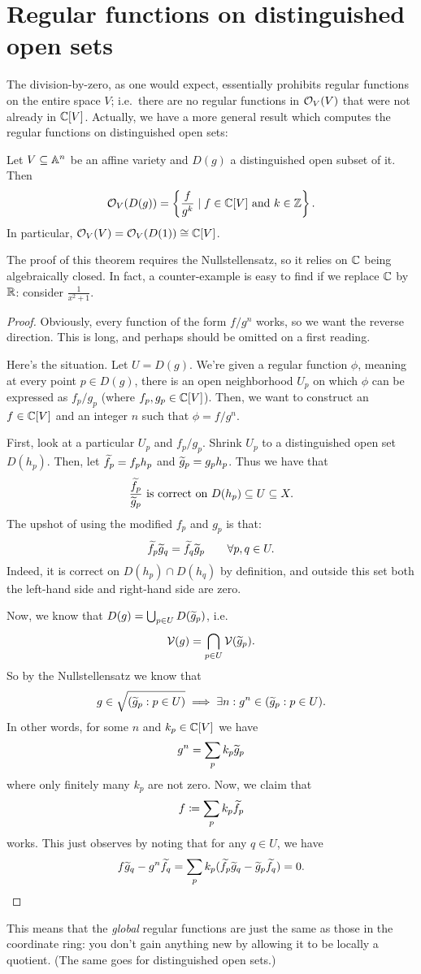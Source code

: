 \section{Regular functions on distinguished open sets}
The division-by-zero, as one would expect,
essentially prohibits regular functions on the entire space $V$;
i.e.\ there are no regular functions in $\mathcal O_V(V)$
that were not already in $\mathbb C[V]$.
Actually, we have a more general result which computes the
regular functions on distinguished open sets:
\begin{theorem}
	\label{thm:reg_func_distinguish_open}
	Let $V \subseteq \mathbb A^n$ be an affine variety
	and $D(g)$ a distinguished open subset of it.
	Then
	\[ \mathcal O_V( D(g) ) = \left\{ \frac{f}{g^k}
		\mid f \in \mathbb C[V] \text{ and } k \in \mathbb Z \right\}.  \]
	In particular, $\mathcal O_V(V) = \mathcal O_V(D(1)) \cong \mathbb C[V]$.
\end{theorem}
The proof of this theorem requires the Nullstellensatz,
so it relies on $\mathbb C$ being algebraically closed.
In fact, a counter-example is easy to find if we replace $\mathbb C$ by $\mathbb R$:
consider $\frac{1}{x^2+1}$.
\begin{proof}
	Obviously, every function of the form $f/g^n$ works,
	so we want the reverse direction.
	This is long, and perhaps should be omitted on a first reading.

	Here's the situation.
	Let $U = D(g)$.
	We're given a regular function $\phi$, meaning at every point $p \in D(g)$,
	there is an open neighborhood $U_p$ on which $\phi$ can be expressed
	as $f_p / g_p$ (where $f_p, g_p \in \mathbb C[V]$).
	Then, we want to construct an $f \in \mathbb C[V]$ and an integer $n$
	such that $\phi = f/g^n$.

	First, look at a particular $U_p$ and $f_p / g_p$.
	Shrink $U_p$ to a distinguished open set $D(h_p)$.
	Then, let $\widetilde f_p = f_p h_p$ and $\widetilde g_p = g_p h_p$.
	Thus we have that
	\[ \frac{\widetilde f_p}{\widetilde g_p} \text{ is correct on }
		D(h_p) \subseteq U \subseteq X. \]
	The upshot of using the modified $f_p$ and $g_p$ is that:
	\[ \widetilde f_p \widetilde g_q = \widetilde f_q \widetilde g_p \qquad \forall p,q \in U. \]
	Indeed, it is correct on $D(h_p) \cap D(h_q)$ by definition,
	and outside this set both the left-hand side and right-hand side are zero.

	Now, we know that $D(g) = \bigcup_{p \in U} D(\widetilde g_p)$, i.e.\
	\[ \mathcal V(g) = \bigcap_{p \in U} \mathcal V(\widetilde g_p). \]
	So by the Nullstellensatz we know that
	\[ g \in \sqrt{(\widetilde g_p : p \in U)}
		\implies \exists n : g^n \in (\widetilde g_p : p \in U). \]
	In other words, for some $n$ and $k_p \in \mathbb C[V]$ we have
	\[ g^n = \sum_p k_p \widetilde g_p \]
	where only finitely many $k_p$ are not zero.
	Now, we claim that
	\[ f \coloneqq \sum_p k_p \widetilde f_p \]
	works.
	This just observes by noting that for any $q \in U$, we have
	\[
		f \widetilde g_q - g^n \widetilde f_q
		= \sum_p k_p(\widetilde f_p \widetilde g_q - \widetilde g_p \widetilde f_q)
		= 0. \qedhere
	\]
\end{proof}
This means that the \emph{global} regular functions
are just the same as those in the coordinate ring:
you don't gain anything new by allowing it to be locally a quotient.
(The same goes for distinguished open sets.)

